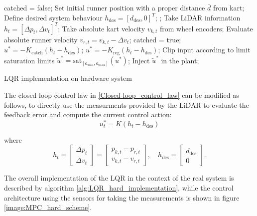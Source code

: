 \documentclass[a4paper,12pt,oneside]{book}
\begin{document}
\begin{algorithm}
\begin{algorithmic}[1]
	\State catched = false;
	\State Set initial runner position with a proper distance $\bar{d}$ from kart;
	\State Define desired system behaviour  $h_{\text{des}} = [d_{\text{des}}, 0]^T$;
	;
		\State Take LiDAR information $h_t = [\Delta p_t, \Delta v_t]^T$;
		\State Take absolute kart velocity $v_{k,t}$ from wheel encoders;
		\State Evaluate absolute runner velocity $v_{r,t} = v_{k,t} - \Delta v_t $;
			\State catched = true;
		\EndIf
			\State $u^* = - K_{\text{catch}} (h_t - h_{\text{des}}) $;
		\Else 
			\State $u^* = - K_{\text{reg}} (h_t - h_{\text{des}}) $;
		\EndIf
		\State Clip input according to limit saturation limits $\tilde{u}^* = \text{sat}_{[a_{\min}, a_{\max}]} (u^*)$;
		\State Inject $\tilde{u}^*$ in the plant;
	\EndFor
\caption{LQR implementation on hardware system}
\label{alg:LQR_hard_implementation}
\end{algorithmic}
\end{algorithm}

\bigskip
The closed loop control law in \eqref{Closed-loop_control_law} can be modified as follows, to directly use the measurments provided by the LiDAR to evaluate the feedback error and compute the current control action:
\begin{equation}
    u_t^* = K (h_t - h_{\text{des}})
\label{Closed-loop_control_law_sensors}
\end{equation}

where 
\begin{equation}
    h_t =
    \begin{bmatrix}
        \Delta p_t  \\
        \Delta v_t
    \end{bmatrix}
	=
    \begin{bmatrix}
        p_{k,t} - p_{r,t} \\
        v_{k,t} - v_{r,t}
    \end{bmatrix},
    \quad
    h_{\text{des}} =
    \begin{bmatrix}
        d_{\text{des}} \\
        0
    \end{bmatrix}.
\end{equation}

The overall implementation of the LQR in the context of the real system is described by algorithm \ref{alg:LQR_hard_implementation}, while the control architecture using the sensors for taking the measurements is shown in figure \ref{image:MPC_hard_scheme}.
\end{document}
